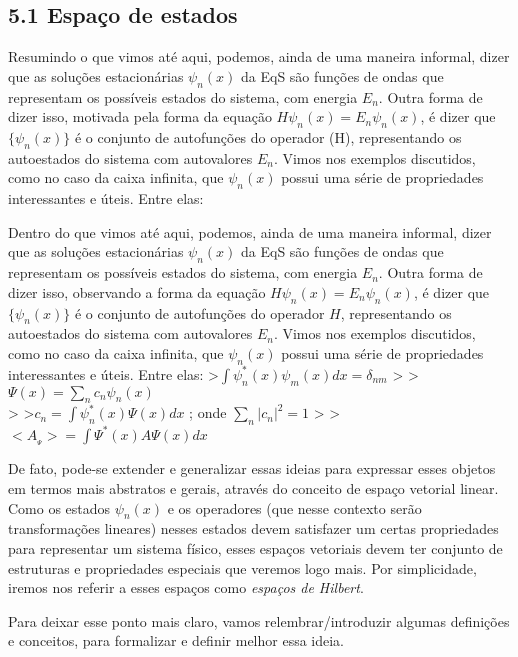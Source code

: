 \documentclass[11pt]{article}
\begin{document}
\hypertarget{espauxe7o-de-estados}{%
\subsection{5.1 Espaço de estados}\label{espauxe7o-de-estados}}

Resumindo o que vimos até aqui, podemos, ainda de uma maneira informal,
dizer que as soluções estacionárias \( \psi_n(x) \) da EqS são funções de
ondas que representam os possíveis estados do sistema, com energia
\(E_n\). Outra forma de dizer isso, motivada pela forma da equação
\( H\psi_n(x)=E_n\psi_n(x) \), é dizer que \( \{ \psi_n(x) \} \) é o conjunto
de autofunções do operador (H), representando os autoestados do sistema
com autovalores \(E_n\). Vimos nos exemplos discutidos, como no caso da
caixa infinita, que \( \psi_n(x) \) possui uma série de propriedades
interessantes e úteis. Entre elas:

Dentro do que vimos até aqui, podemos, ainda de uma maneira informal,
dizer que as soluções estacionárias \(\psi_n(x)\) da EqS são funções de
ondas que representam os possíveis estados do sistema, com energia
\(E_n\). Outra forma de dizer isso, observando a forma da equação
\(H\psi_n(x)=E_n\psi_n(x)\), é dizer que \(\{\psi_n(x)\}\) é o conjunto
de autofunções do operador \(H\), representando os autoestados do
sistema com autovalores \(E_n\). Vimos nos exemplos discutidos, como no
caso da caixa infinita, que \(\psi_n(x)\) possui uma série de
propriedades interessantes e úteis. Entre elas:
\textgreater{}\(\int \psi^*_n(x)\psi_m(x)dx=\delta_{nm}\) \textgreater{}
\textgreater{}\(\Psi(x)=\sum_n c_n \psi_n(x)\)\\
\textgreater{} \textgreater{}\(c_n = \int \psi^*_n(x) \Psi(x)dx\) ; onde
\(\sum_n |c_n|^2 = 1\) \textgreater{}
\textgreater{}\(<A_{_{\Psi}}> = \int \Psi^*(x) A \Psi(x) dx\)

    De fato, pode-se extender e generalizar essas ideias para expressar
esses objetos em termos mais abstratos e gerais, através do conceito de
espaço vetorial linear. Como os estados \(\psi_n(x)\) e os operadores
(que nesse contexto serão transformações lineares) nesses estados devem
satisfazer um certas propriedades para representar um sistema físico,
esses espaços vetoriais devem ter conjunto de estruturas e propriedades
especiais que veremos logo mais. Por simplicidade, iremos nos referir a
esses espaços como \emph{espaços de Hilbert}.

    Para deixar esse ponto mais claro, vamos relembrar/introduzir algumas
definições e conceitos, para formalizar e definir melhor essa ideia.
\end{document}
